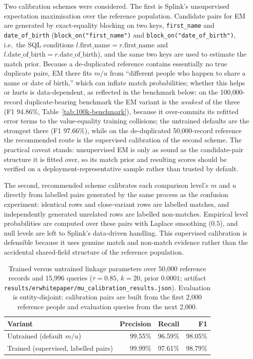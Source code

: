 \documentclass[11pt]{article}
\begin{document}
Two calibration schemes were considered. The first is Splink's unsupervised expectation maximisation over the reference population. Candidate pairs for EM are generated by exact-equality blocking on two keys, \texttt{first\_name} and \texttt{date\_of\_birth} (\texttt{block\_on("first\_name")} and \texttt{block\_on("date\_of\_birth")}, i.e.\ the SQL conditions $l.\text{first\_name}=r.\text{first\_name}$ and $l.\text{date\_of\_birth}=r.\text{date\_of\_birth}$), and the same two keys are used to estimate the match prior. Because a de-duplicated reference contains essentially no true duplicate pairs, EM there fits $m/u$ from ``different people who happen to share a name or date of birth,'' which can inflate match probabilities; whether this helps or hurts is data-dependent, as reflected in the benchmark below: on the 100{,}000-record duplicate-bearing benchmark the EM variant is the \emph{weakest} of the three (F1 94.86\%, Table~\ref{tab:100k-benchmark}), because it over-commits its refitted error terms to the value-equality training collisions; the untrained defaults are the strongest there (F1 97.66\%), while on the de-duplicated 50{,}000-record reference the recommended route is the supervised calibration of the second scheme. The practical caveat stands: unsupervised EM is only as sound as the candidate-pair structure it is fitted over, so its match prior and resulting scores should be verified on a deployment-representative sample rather than trusted by default.

The second, recommended scheme calibrates each comparison level's $m$ and $u$ directly from labelled pairs generated by the same process as the confusion experiment: identical rows and close-variant rows are labelled matches, and independently generated unrelated rows are labelled non-matches. Empirical level probabilities are computed over these pairs with Laplace smoothing ($0.5$), and null levels are left to Splink's data-driven handling. This supervised calibration is defensible because it uses genuine match and non-match evidence rather than the accidental shared-field structure of the reference population.

\begin{table}[h]
\centering
\caption{Trained versus untrained linkage parameters over 50,000 reference records and 15,996 queries ($\tau=0.85$, $k=20$, prior $0.0001$; artifact \texttt{results/erwhitepaper/mu\_calibration\_results.json}). Evaluation is entity-disjoint: calibration pairs are built from the first 2{,}000 reference people and evaluation queries from the next 2{,}000.}
\label{tab:mu-train-untrain}
\begin{tabular}{lrrr}
\toprule
Variant & Precision & Recall & F1 \\
\midrule
Untrained (default $m/u$) & 99.55\% & 96.59\% & 98.05\% \\
Trained (supervised, labelled pairs) & 99.99\% & 97.61\% & 98.79\% \\
\bottomrule
\end{tabular}
\end{table}
\end{document}
